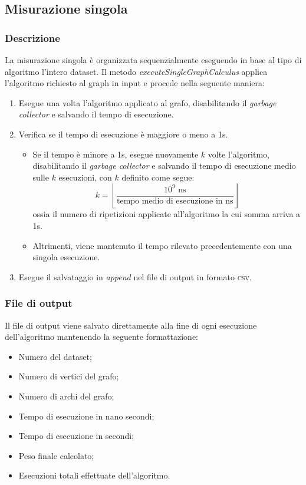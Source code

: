 \subsection{Misurazione singola}

\subsubsection{Descrizione} 

La misurazione singola è organizzata sequenzialmente eseguendo in base al tipo di algoritmo l'intero dataset. Il metodo \textit{executeSingleGraphCalculus} applica l'algoritmo richiesto al graph in input e procede nella seguente maniera:

\begin{enumerate}
    \item Esegue una volta l'algoritmo applicato al grafo, disabilitando il \textit{garbage collector} e salvando il tempo di esecuzione.
    \item Verifica se il tempo di esecuzione è maggiore o meno a 1s.
    \begin{itemize}
        \item Se il tempo è minore a 1s, esegue nuovamente \(k\) volte l'algoritmo, disabilitando il \textit{garbage collector} e salvando il tempo di esecuzione medio sulle \(k\) esecuzioni, con \(k\) definito come segue:  \[ k = \left\lfloor\frac{10^9 \textrm{ ns}}{\textrm{tempo medio di esecuzione in ns}}\right\rfloor\]
        ossia il numero di ripetizioni applicate all'algoritmo la cui somma arriva a 1s.
        \item Altrimenti, viene mantenuto il tempo rilevato precedentemente con una singola esecuzione.
    \end{itemize}
    \item Esegue il salvataggio in \textit{append} nel file di output in formato \textsc{csv}.
\end{enumerate}


\subsubsection{File di output}

Il file di output viene salvato direttamente alla fine di ogni esecuzione dell'algoritmo mantenendo la seguente formattazione:
\begin{itemize}
    \item Numero del dataset;
    \item Numero di vertici del grafo;
    \item Numero di archi del grafo;
    \item Tempo di esecuzione in nano secondi;
    \item Tempo di esecuzione in secondi;
    \item Peso finale calcolato;
    \item Esecuzioni totali effettuate dell'algoritmo.
\end{itemize}



